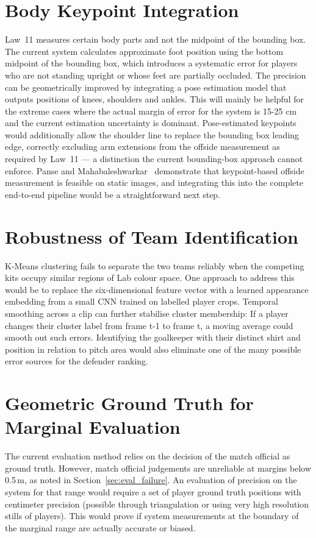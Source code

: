 \section{Body Keypoint Integration}%
\label{sec:fw_keypoints}

Law~11 measures certain body parts and not the midpoint of the bounding box. The current system calculates approximate foot position using the bottom midpoint of the bounding box, which introduces a systematic error for players who are not standing upright or whose feet are partially occluded. The precision can be geometrically improved by integrating a pose estimation model that outputs positions of knees, shoulders and ankles. This will mainly be helpful for the extreme cases where the actual margin of error for the system is 15-25 cm and the current estimation uncertainty is dominant. Pose-estimated keypoints would additionally allow the shoulder line to replace the bounding box leading edge, correctly excluding arm extensions from the offside measurement as required by Law~11 --- a distinction the current bounding-box approach cannot enforce. Panse and Mahabaleshwarkar~\cite{panse2020dataset} demonstrate that keypoint-based offside measurement is feasible on static images, and integrating this into the complete end-to-end pipeline would be a straightforward next step.

\section{Robustness of Team Identification}%
\label{sec:fw_team_id}
 K-Means clustering fails to separate the two teams reliably when the competing kits occupy similar regions of Lab colour space. One approach to address this would be to replace the six-dimensional feature vector with a learned appearance embedding from a small CNN trained on labelled player crops. Temporal smoothing across a clip can further stabilise cluster membership: If a player changes their cluster label from frame t-1 to frame t, a moving average could smooth out such errors. Identifying the goalkeeper with their distinct shirt and position in relation to pitch area would also eliminate one of the many possible error sources for the defender ranking.

\section{Geometric Ground Truth for Marginal Evaluation}%
\label{sec:fw_groundtruth}
 The current evaluation method relies on the decision of the match official as ground truth. However, match official judgements are unreliable at margins below 0.5\,m, as noted in Section~\ref{sec:eval_failure}. An evaluation of precision on the system for that range would require a set of player ground truth positions with centimeter precision (possible through triangulation or using very high resolution stills of players). This would prove if system measurements at the boundary of the marginal range are actually accurate or biased.